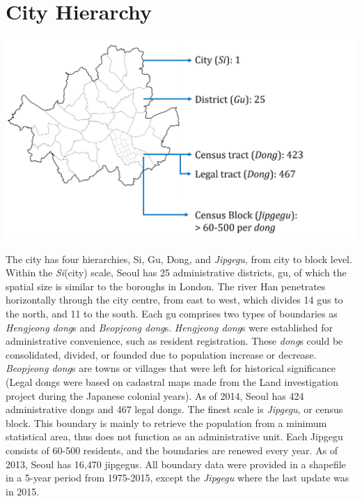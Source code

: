 \documentclass[]{book}
\begin{document}
\section{City Hierarchy}\label{city-hierarchy}

\begin{center}\includegraphics[width=16.82in]{images/02_boundary} \end{center}

The city has four hierarchies, Si, Gu, Dong, and \emph{Jipgegu}, from
city to block level. Within the \emph{Si}(city) scale, Seoul has 25
administrative districts, gu, of which the spatial size is similar to
the boroughs in London. The river Han penetrates horizontally through
the city centre, from east to west, which divides 14 gus to the north,
and 11 to the south. Each gu comprises two types of boundaries as
\emph{Hengjeong dong}s and \emph{Beopjeong dong}s. \emph{Hengjeong
dong}s were established for administrative convenience, such as resident
registration. These \emph{dong}s could be consolidated, divided, or
founded due to population increase or decrease. \emph{Beopjeong dong}s
are towns or villages that were left for historical significance (Legal
dongs were based on cadastral maps made from the Land investigation
project during the Japanese colonial years). As of 2014, Seoul has 424
administrative dongs and 467 legal dongs. The finest scale is
\emph{Jipgegu}, or census block. This boundary is mainly to retrieve the
population from a minimum statistical area, thus does not function as an
administrative unit. Each Jipgegu consists of 60-500 residents, and the
boundaries are renewed every year. As of 2013, Seoul has 16,470
jipgegus. All boundary data were provided in a shapefile in a 5-year
period from 1975-2015, except the \emph{Jipgegu} where the last update
was in 2015.
\end{document}
